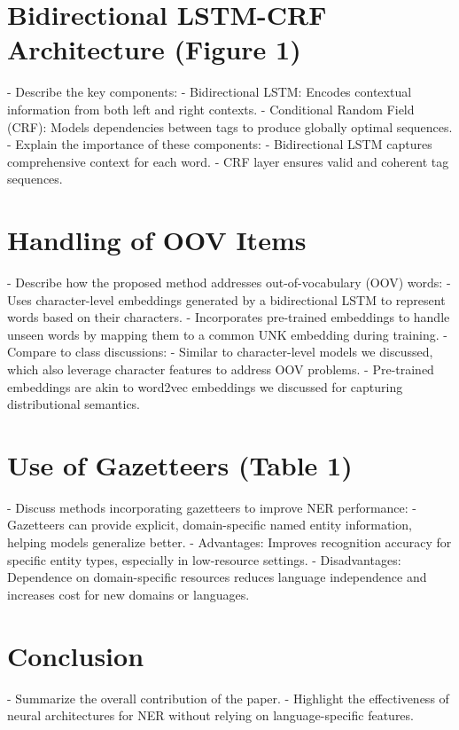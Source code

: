 \documentclass[11pt]{article}
\begin{document}
\section*{Bidirectional LSTM-CRF Architecture (Figure 1)}
- Describe the key components:
  - Bidirectional LSTM: Encodes contextual information from both left and right contexts.
  - Conditional Random Field (CRF): Models dependencies between tags to produce globally optimal sequences.
- Explain the importance of these components:
  - Bidirectional LSTM captures comprehensive context for each word.
  - CRF layer ensures valid and coherent tag sequences.

\section*{Handling of OOV Items}
- Describe how the proposed method addresses out-of-vocabulary (OOV) words:
  - Uses character-level embeddings generated by a bidirectional LSTM to represent words based on their characters.
  - Incorporates pre-trained embeddings to handle unseen words by mapping them to a common UNK embedding during training.
- Compare to class discussions:
  - Similar to character-level models we discussed, which also leverage character features to address OOV problems.
  - Pre-trained embeddings are akin to word2vec embeddings we discussed for capturing distributional semantics.

\section*{Use of Gazetteers (Table 1)}
- Discuss methods incorporating gazetteers to improve NER performance:
  - Gazetteers can provide explicit, domain-specific named entity information, helping models generalize better.
  - Advantages: Improves recognition accuracy for specific entity types, especially in low-resource settings.
  - Disadvantages: Dependence on domain-specific resources reduces language independence and increases cost for new domains or languages.

\section*{Conclusion}
- Summarize the overall contribution of the paper.
- Highlight the effectiveness of neural architectures for NER without relying on language-specific features.
\end{document}
